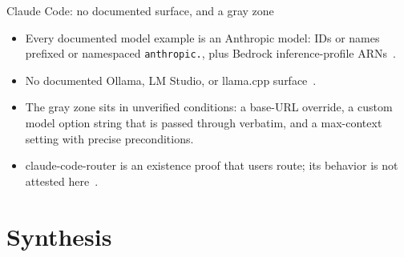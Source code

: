 \documentclass[aspectratio=169,11pt]{beamer}
\begin{document}
\begin{frame}{Claude Code: no documented surface, and a gray zone}
  \begin{itemize}
    \item Every documented model example is an Anthropic model: IDs or
    names prefixed or namespaced \texttt{anthropic.}, plus Bedrock
    inference-profile ARNs~\citep{claudeCodeModelDocs,claudeCodeBedrockDocs}.
    \item No documented Ollama, LM Studio, or llama.cpp
    surface~\citep{ollamaCompatDocs,lmstudioApiDocs,llamaCppServerDocs}.
    \item The gray zone sits in unverified conditions: a base-URL
    override, a custom model option string that is passed through
    verbatim, and a max-context setting with precise preconditions.
    \item \textsf{claude-code-router} is an existence proof that users
    route; its behavior is not attested here~\citep{claudeCodeRouterContext}.
  \end{itemize}
\end{frame}

\section{Synthesis}
\end{document}
